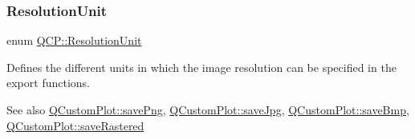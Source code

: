 \subsubsection{\texorpdfstring{Resolution\+Unit}{ResolutionUnit}\hspace{0.1cm}{\footnotesize\ttfamily [1/2]}}
{\footnotesize\ttfamily enum \hyperlink{namespace_q_c_p_a715d46153da230990aa887d0f0602452}{Q\+C\+P\+::\+Resolution\+Unit}}

Defines the different units in which the image resolution can be specified in the export functions.

\begin{DoxySeeAlso}{See also}
\hyperlink{class_q_custom_plot_ac92cc9256d12f354b40a4be4600b5fb9}{Q\+Custom\+Plot\+::save\+Png}, \hyperlink{class_q_custom_plot_a76f0d278e630a711fa6f48048cfd83e4}{Q\+Custom\+Plot\+::save\+Jpg}, \hyperlink{class_q_custom_plot_ae3a86ed0795670e50afa21759d4fa13d}{Q\+Custom\+Plot\+::save\+Bmp}, \hyperlink{class_q_custom_plot_ad7723ce2edfa270632ef42b03a444352}{Q\+Custom\+Plot\+::save\+Rastered} 
\end{DoxySeeAlso}
